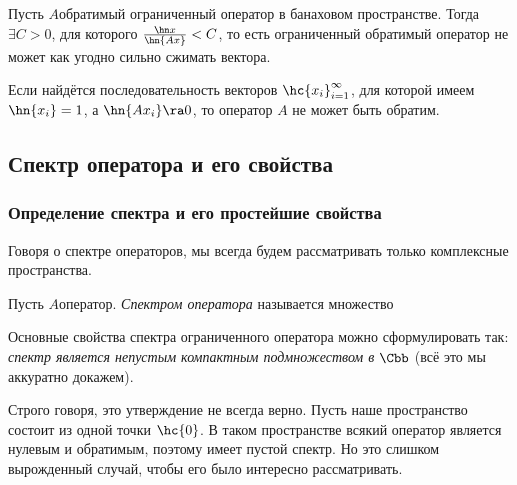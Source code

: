 \documentclass[a4paper]{article}
\newcommand{\seq}[3]{\hc{#1}_{{#2}}^{{#3}}}
\begin{document}
\begin{imp}
Пусть $A$\т обратимый ограниченный оператор в банаховом пространстве.
Тогда $\exi C>0$, для которого $\frac{\hn x}{\hn{Ax}} < C$, то есть ограниченный обратимый оператор
не может как угодно сильно сжимать вектора.
\end{imp}

\begin{imp}
\label{imp:unrevertibility}
Если найдётся последовательность векторов $\seq{x_i}{i=1}{\infty}$, для которой имеем $\hn{x_i} = 1$,
а $\hn{Ax_i} \ra 0$, то оператор $A$ не может быть обратим.
\end{imp}


\subsection{Спектр оператора и его свойства}

\subsubsection{Определение спектра и его простейшие свойства}

Говоря о спектре операторов, мы всегда будем рассматривать только комплексные пространства.

\begin{df}
Пусть $A$\т оператор. \emph{Спектром оператора} называется множество
\end{df}

Основные свойства спектра ограниченного оператора можно сформулировать так:
\emph{спектр является непустым компактным подмножеством в $\Cbb$} (всё это мы аккуратно докажем).

Строго говоря, это утверждение не всегда верно. Пусть наше пространство состоит
из одной точки $\hc{0}$. В таком пространстве всякий оператор является нулевым
и обратимым, поэтому имеет пустой спектр. Но это слишком вырожденный случай,
чтобы его было интересно рассматривать.
\end{document}
